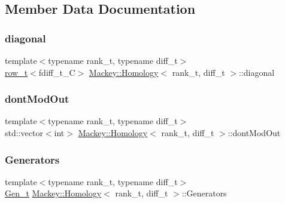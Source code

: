 \subsection{Member Data Documentation}
\mbox{\label{classMackey_1_1Homology_acff409513ea412c16b84f304d097059b}} 
\subsubsection{\texorpdfstring{diagonal}{diagonal}}
{\footnotesize\ttfamily template$<$typename rank\+\_\+t, typename diff\+\_\+t$>$ \\
\hyperlink{namespaceMackey_a6d37801553e585770ca7d1243ab3b213}{row\+\_\+t}$<$fdiff\+\_\+t\+\_\+C$>$ \hyperlink{classMackey_1_1Homology}{Mackey\+::\+Homology}$<$ rank\+\_\+t, diff\+\_\+t $>$\+::diagonal}

\mbox{\label{classMackey_1_1Homology_a21c18ecdeea401821a56c7c00569190b}} 
\subsubsection{\texorpdfstring{dont\+Mod\+Out}{dontModOut}}
{\footnotesize\ttfamily template$<$typename rank\+\_\+t, typename diff\+\_\+t$>$ \\
std\+::vector$<$int$>$ \hyperlink{classMackey_1_1Homology}{Mackey\+::\+Homology}$<$ rank\+\_\+t, diff\+\_\+t $>$\+::dont\+Mod\+Out}

\mbox{\label{classMackey_1_1Homology_af3eff7d2cb42b44a29f6a92172096b3d}} 
\subsubsection{\texorpdfstring{Generators}{Generators}}
{\footnotesize\ttfamily template$<$typename rank\+\_\+t, typename diff\+\_\+t$>$ \\
\hyperlink{classMackey_1_1Homology_a9a8e354083ac094720820a5ff6bcff03}{Gen\+\_\+t} \hyperlink{classMackey_1_1Homology}{Mackey\+::\+Homology}$<$ rank\+\_\+t, diff\+\_\+t $>$\+::Generators}




